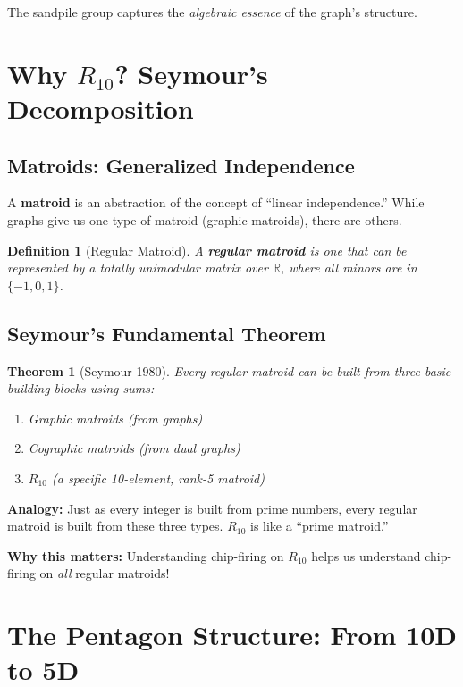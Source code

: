 \documentclass[11pt]{article}
\newtheorem{theorem}{Theorem}
\newtheorem{definition}{Definition}
\newcommand{\R}{\mathbb{R}}
\begin{document}
The sandpile group captures the \emph{algebraic essence} of the graph's structure.

\section{Why $R_{10}$? Seymour's Decomposition}

\subsection{Matroids: Generalized Independence}

A \textbf{matroid} is an abstraction of the concept of ``linear independence.'' While graphs give us one type of matroid (graphic matroids), there are others.

\begin{definition}[Regular Matroid]
A \textbf{regular matroid} is one that can be represented by a totally unimodular matrix over $\R$, where all minors are in $\{-1, 0, 1\}$.
\end{definition}

\subsection{Seymour's Fundamental Theorem}

\begin{theorem}[Seymour 1980]
Every regular matroid can be built from three basic building blocks using sums:
\begin{enumerate}
    \item Graphic matroids (from graphs)
    \item Cographic matroids (from dual graphs)
    \item \textbf{$R_{10}$} (a specific 10-element, rank-5 matroid)
\end{enumerate}
\end{theorem}

\textbf{Analogy:} Just as every integer is built from prime numbers, every regular matroid is built from these three types. $R_{10}$ is like a ``prime matroid.''

\textbf{Why this matters:} Understanding chip-firing on $R_{10}$ helps us understand chip-firing on \emph{all} regular matroids!

\section{The Pentagon Structure: From 10D to 5D}
\end{document}
